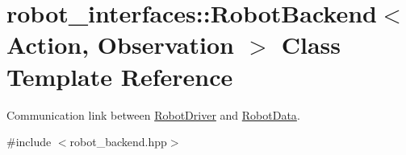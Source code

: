 \hypertarget{classrobot__interfaces_1_1RobotBackend}{}\section{robot\+\_\+interfaces\+:\+:Robot\+Backend$<$ Action, Observation $>$ Class Template Reference}
\label{classrobot__interfaces_1_1RobotBackend}


Communication link between \hyperlink{classrobot__interfaces_1_1RobotDriver}{Robot\+Driver} and \hyperlink{classrobot__interfaces_1_1RobotData}{Robot\+Data}.  




{\ttfamily \#include $<$robot\+\_\+backend.\+hpp$>$}

